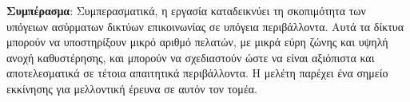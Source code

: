 \documentclass[12pt]{article}
\begin{document}
\begin{multicols}{2}
    \textbf{Συμπέρασμα}: Συμπερασματικά, η εργασία
    καταδεικνύει τη σκοπιμότητα των υπόγειων ασύρματων
    δικτύων επικοινωνίας σε υπόγεια περιβάλλοντα. Αυτά τα
    δίκτυα μπορούν να υποστηρίξουν μικρό αριθμό πελατών, με
    μικρά εύρη ζώνης και υψηλή ανοχή καθυστέρησης, και
    μπορούν να σχεδιαστούν ώστε να είναι αξιόπιστα και
    αποτελεσματικά σε τέτοια απαιτητικά περιβάλλοντα. Η
    μελέτη παρέχει ένα σημείο εκκίνησης για μελλοντική
    έρευνα σε αυτόν τον τομέα.

    \printbibliography

\end{multicols}
\end{document}
